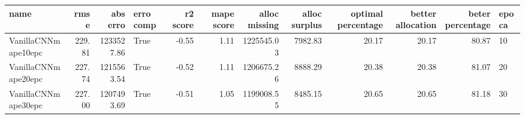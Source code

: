 \begin{tabular}{lrrlrrrrrrrl}
\toprule
name & rmse & abs erro & erro comp & r2 score & mape score & alloc missing & alloc surplus & optimal percentage & better allocation & beter percentage & epoca \\
\midrule
VanillaCNNmape10epc & 229.81 & 1233527.86 & True & -0.55 & 1.11 & 1225545.03 & 7982.83 & 20.17 & 20.17 & 80.87 & 10 \\
VanillaCNNmape20epc & 227.74 & 1215563.54 & True & -0.52 & 1.11 & 1206675.26 & 8888.29 & 20.38 & 20.38 & 81.07 & 20 \\
VanillaCNNmape30epc & 227.00 & 1207493.69 & True & -0.51 & 1.05 & 1199008.55 & 8485.15 & 20.65 & 20.65 & 81.18 & 30 \\
\bottomrule
\end{tabular}
